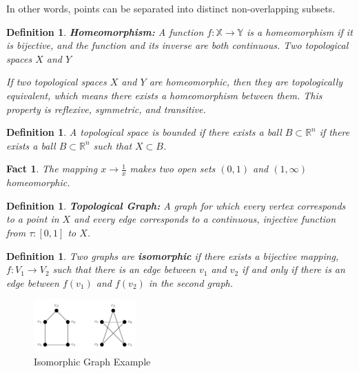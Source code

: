 \documentclass[11pt]{article}
\newtheorem{definition}[theorem]{Definition}
\newtheorem{fact}[theorem]{Fact}
\begin{document}
In other words, points can be separated into distinct non-overlapping subsets.

\begin{definition}
  \textbf{Homeomorphism:} A function $f: \mathbb{X} \rightarrow \mathbb{Y}$ is a homeomorphism if it is bijective, and
  the function and its inverse are both continuous. Two topological spaces $X$ and $Y$
  
  If two topological spaces $X$ and $Y$ are homeomorphic, then they are topologically equivalent, which means there exists a homeomorphism between them.
  This property is reflexive, symmetric, and transitive.

\end{definition}
\begin{definition}
  A topological space is bounded if there exists a ball $B \subset \mathbb{R}^n$ if there exists a ball
  $B \subset \mathbb{R}^n$ such that $X \subset B$. 

\end{definition}
\begin{fact}
  The mapping $x \rightarrow \frac{1}{x}$ makes two open sets $(0, 1)$ and $(1, \infty)$ homeomorphic.  
\end{fact}

\begin{definition}
  \textbf{Topological Graph:} A graph for which every vertex corresponds to a point in $X$ and every edge corresponds
  to a continuous, injective function from $\tau : [0, 1]$ to $X$.
\end{definition}

\begin{definition}
  Two graphs are \textbf{isomorphic} if there exists a bijective mapping, $f: V_1 \rightarrow V_2$ such that there 
  is an edge between $v_1$ and $v_2$ if and only if there is an edge between $f(v_1)$ and $f(v_2)$ in the second graph.
\end{definition}

\begin{figure}[h]
  \centering
  \includegraphics[width=0.35\textwidth]{isomorphic_graph.png}
  \caption{Isomorphic Graph Example}
\end{figure}
\end{document}
